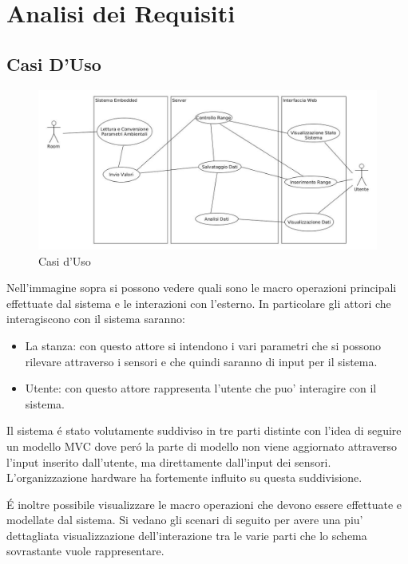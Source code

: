 \section{Analisi dei Requisiti}
\subsection{Casi D'Uso}

\begin{figure}[ht]
\centering
\includegraphics[width=\textwidth]{Figures/UseCases.jpg}
\caption{Casi d'Uso}
\end{figure}

Nell'immagine sopra si possono vedere quali sono le macro operazioni principali effettuate dal sistema e le interazioni con l'esterno. In particolare gli attori che interagiscono con il sistema saranno:

\begin{itemize}
  \item La stanza: con questo attore si intendono i vari parametri che si possono rilevare attraverso i sensori e che quindi saranno di input per il sistema.
  \item Utente: con questo attore rappresenta l'utente che puo' interagire con il sistema.
\end{itemize}

Il sistema \'e stato volutamente suddiviso in tre parti distinte con l'idea di seguire un modello MVC dove per\'o la parte di modello non viene aggiornato attraverso l'input inserito dall'utente, ma direttamente dall'input dei sensori. L'organizzazione hardware ha fortemente influito su questa suddivisione.

\'E inoltre possibile visualizzare le macro operazioni che devono essere effettuate e modellate dal sistema. Si vedano gli scenari di seguito per avere una piu' dettagliata visualizzazione dell'interazione tra le varie parti che lo schema sovrastante vuole rappresentare.


